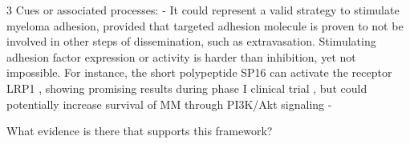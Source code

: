 3 Cues or associated processes:
- It could represent a valid strategy to
stimulate myeloma adhesion, provided that targeted adhesion molecule is proven
to not be involved in other steps of dissemination, such as extravasation.
Stimulating adhesion factor expression or activity is harder than inhibition,
yet not impossible. For instance, the short polypeptide SP16 can activate the
receptor LRP1 , showing promising results during phase I
clinical trial \cite{wohlfordPhaseClinicalTrial2021}, but could potentially
increase survival of MM through PI3K/Akt signaling
\cite{potereDevelopingLRP1Agonists2019, heinemannInhibitingPI3KAKT2022} -







What evidence is there that supports this framework?






